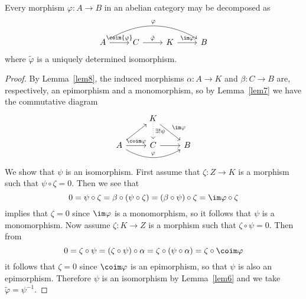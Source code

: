 \documentclass[10pt]{amsart}
\begin{document}
\begin{thm}\label{thm1}
  Every morphism $\varphi : A \rightarrow B$ in an abelian category may be decomposed as
  $$\begin{tikzcd}
    A \arrow[bend left]{rrr}{\varphi} \arrow{r}{\coim{\varphi}}& C \arrow{r}{\tilde\varphi}& K \arrow{r}{\im\varphi}& B
  \end{tikzcd}$$
  where $\tilde\varphi$ is a uniquely determined isomorphism.

  \begin{proof}
    By Lemma~\ref{lem8}, the induced morphisms $\alpha : A \rightarrow K$ and $\beta : C \rightarrow B$ are, respectively, an epimorphism and a monomorphism, so by Lemma~\ref{lem7} we have the commutative diagram
    $$\begin{tikzcd}
      & K \arrow{rd}{\im\varphi} \arrow[dotted]{d}{\exists ! \psi}& \\
      A \arrow[bend right]{rr}{\varphi}\arrow{ru}\arrow{r}{\coim\varphi} & C \arrow{r} & B
    \end{tikzcd}$$
    We show that $\psi$ is an isomorphism.
    First assume that $\zeta : Z \rightarrow K$ is a morphism such that $\psi \circ \zeta = 0$.
    Then we see that
    $$0 = \psi \circ \zeta = \beta \circ (\psi \circ \zeta) = (\beta \circ \psi) \circ \zeta = \im\varphi \circ \zeta$$
    implies that $\zeta = 0$ since $\im\varphi$ is a monomorphism, so it follows that $\psi$ is a monomorphism.
    Now assume $\zeta : K \rightarrow Z$ is a morphism such that $\zeta \circ \psi = 0$.
    Then from
    $$0 = \zeta \circ \psi = (\zeta \circ \psi) \circ \alpha = \zeta \circ (\psi \circ \alpha) = \zeta \circ \coim\varphi$$
    it follows that $\zeta = 0$ since $\coim\varphi$ is an epimorphism, so that $\psi$ is also an epimorphism.
    Therefore $\psi$ is an isomorphism by Lemma~\ref{lem6} and we take $\tilde{\varphi} = \psi^{-1}$.
  \end{proof}
\end{thm}
\end{document}
